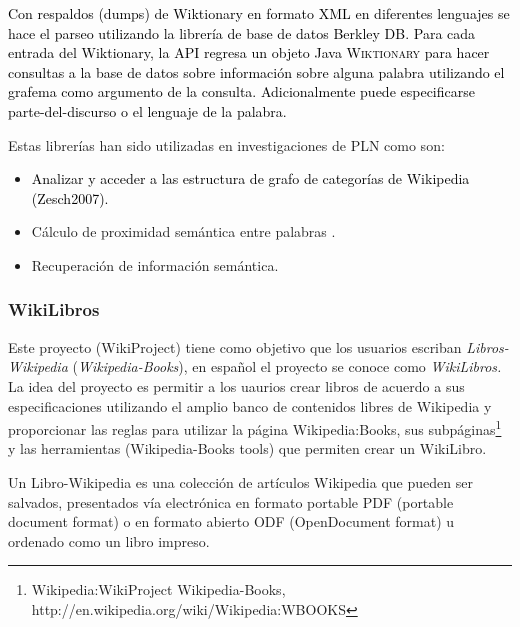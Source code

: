 \documentclass[letterpaper]{article}
\newcommand\textstylebibuscitbase[1]{#1}
\newcommand\liststyleWWviiiNumiv{%
\renewcommand\labelitemi{{\textbullet}}
\renewcommand\labelitemii{${\circ}$}
\renewcommand\labelitemiii{${\blacksquare}$}
\renewcommand\labelitemiv{{\textbullet}}
}
\begin{document}
\bigskip

{\sffamily
\textcolor{black}{Con respaldos (dumps) de Wiktionary en formato XML en
diferentes lenguajes se hace el parseo utilizando la librer\'ia de base
de datos Berkley DB. Para cada }\textcolor{black}{entrada del
Wiktionary, la API regresa un objeto Java
}\textsc{\textcolor{black}{Wiktionary }}\textcolor{black}{para hacer
consultas a la base de datos sobre informaci\'on sobre alguna palabra
utilizando el grafema como argumento de la consulta. Adicionalmente
puede especificarse parte-del-discurso o el lenguaje de la palabra.}}


\bigskip

{\sffamily
Estas librer\'ias han sido utilizadas en investigaciones de PLN como
son:}

\liststyleWWviiiNumiv
\begin{itemize}
\item {\sffamily
\textcolor{black}{Analizar y acceder a las estructura de grafo de
categor\'ias de Wikipedia
}\textstylebibuscitbase{\textcolor{black}{(Zesch2007)}}\textcolor{black}{.}}
\item {\sffamily
C\'alculo de proximidad sem\'antica entre palabras .}
\item {\sffamily
Recuperaci\'on de informaci\'on sem\'antica.}
\end{itemize}

\bigskip

\subsubsection[WikiLibros]{WikiLibros}
\hypertarget{RefHeading10810782078703}{}
\bigskip

{\sffamily
Este proyecto (WikiProject) tiene como objetivo que los usuarios
escriban \textit{Libros-Wikipedia} (\textit{Wikipedia-Books}), en
espa\~nol el proyecto se conoce como \textit{WikiLibros. }La idea del
proyecto es permitir a los uaurios crear libros de acuerdo a sus
especificaciones utilizando el amplio banco de contenidos libres de
Wikipedia y proporcionar las reglas para utilizar la p\'agina
Wikipedia:Books, sus subp\'aginas\footnote{Wikipedia:WikiProject
Wikipedia-Books, http://en.wikipedia.org/wiki/Wikipedia:WBOOKS} y las
herramientas (Wikipedia-Books tools) que permiten crear un WikiLibro. }

{\sffamily
Un Libro-Wikipedia es una colecci\'on de art\'iculos Wikipedia que
pueden ser salvados, presentados v\'ia electr\'onica en formato
portable PDF (portable document format) o en formato abierto ODF
(OpenDocument format) u ordenado como un libro impreso.}
\end{document}
